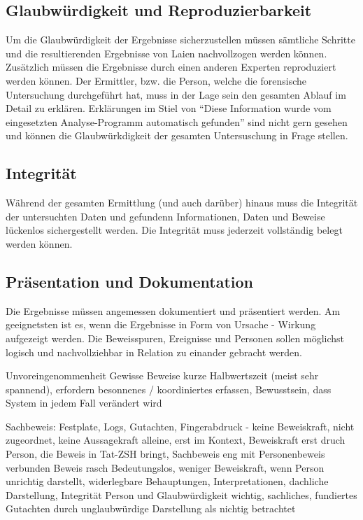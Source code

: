 \subsection{Glaubwürdigkeit und Reproduzierbarkeit}
Um die Glaubwürdigkeit der Ergebnisse sicherzustellen müssen sämtliche Schritte und die resultierenden Ergebnisse von Laien nachvollzogen werden können. Zusätzlich müssen die Ergebnisse durch einen anderen Experten reproduziert werden können. Der Ermittler, bzw. die Person, welche die forensische Untersuchung durchgeführt hat, muss in der Lage sein den gesamten Ablauf im Detail zu erklären. Erklärungen im Stiel von "`Diese Information wurde vom eingesetzten Analyse-Programm automatisch gefunden"' sind nicht gern gesehen und können die Glaubwürkdigkeit der gesamten Untersuschung in Frage stellen.


\subsection{Integrität}
Während der gesamten Ermittlung (und auch darüber) hinaus muss die Integrität der untersuchten Daten und gefundenn Informationen, Daten und Beweise lückenlos sichergestellt werden. Die Integrität muss jederzeit vollständig belegt werden können.

\subsection{Präsentation und Dokumentation}
Die Ergebnisse müssen angemessen dokumentiert und präsentiert werden. Am geeignetsten ist es, wenn die Ergebnisse in Form von Ursache - Wirkung aufgezeigt werden. Die Beweisspuren, Ereignisse und Personen sollen möglichst logisch und nachvollziehbar in Relation zu einander gebracht werden.





Unvoreingenommenheit
Gewisse Beweise kurze Halbwertszeit (meist sehr spannend), erfordern besonnenes / koordiniertes erfassen, Bewusstsein, dass System in jedem Fall verändert wird

Sachbeweis: Festplate, Logs, Gutachten, Fingerabdruck - keine Beweiskraft, nicht zugeordnet, keine Aussagekraft alleine, erst im Kontext, Beweiskraft erst druch Person, die Beweis in Tat-ZSH bringt, Sachbeweis eng mit Personenbeweis verbunden
Beweis rasch Bedeutungslos, weniger Beweiskraft, wenn Person unrichtig darstellt, widerlegbare Behauptungen, Interpretationen, dachliche Darstellung, Integrität Person und Glaubwürdigkeit wichtig, sachliches, fundiertes Gutachten durch unglaubwürdige Darstellung als nichtig betrachtet

